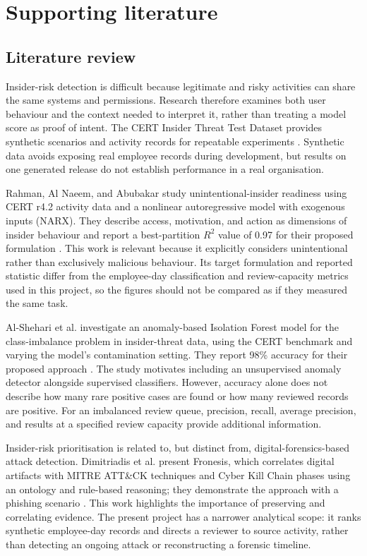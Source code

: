 \documentclass[12pt,a4paper,oneside]{report}
\begin{document}
\chapter{Supporting literature}
\label{chap:literature}

\section{Literature review}
Insider-risk detection is difficult because legitimate and risky
activities can share the same systems and permissions. Research
therefore examines both user behaviour and the context needed to
interpret it, rather than treating a model score as proof of intent.
The CERT Insider Threat Test Dataset provides synthetic scenarios and
activity records for repeatable experiments \cite{cert}. Synthetic
data avoids exposing real employee records during development, but
results on one generated release do not establish performance in a
real organisation.

Rahman, Al Naeem, and Abubakar study unintentional-insider readiness
using CERT r4.2 activity data and a nonlinear autoregressive model with
exogenous inputs (NARX). They describe access, motivation, and action
as dimensions of insider behaviour and report a best-partition
\(R^2\) value of 0.97 for their proposed formulation
\cite{rahman2022unintentional}. This work is relevant because it
explicitly considers unintentional rather than exclusively malicious
behaviour. Its target formulation and reported statistic differ from
the employee-day classification and review-capacity metrics used in
this project, so the figures should not be compared as if they measured
the same task.

Al-Shehari et al. investigate an anomaly-based Isolation Forest model
for the class-imbalance problem in insider-threat data, using the CERT
benchmark and varying the model's contamination setting. They report
98\% accuracy for their proposed approach
\cite{alshehari2023isolation}. The study motivates including an
unsupervised anomaly detector alongside supervised classifiers.
However, accuracy alone does not describe how many rare positive cases
are found or how many reviewed records are positive. For an imbalanced
review queue, precision, recall, average precision, and results at a
specified review capacity provide additional information.

Insider-risk prioritisation is related to, but distinct from,
digital-forensics-based attack detection. Dimitriadis et al. present
Fronesis, which correlates digital artifacts with MITRE ATT\&CK
techniques and Cyber Kill Chain phases using an ontology and
rule-based reasoning; they demonstrate the approach with a phishing
scenario \cite{dimitriadis2023fronesis}. This work highlights the
importance of preserving and correlating evidence. The present project
has a narrower analytical scope: it ranks synthetic employee-day
records and directs a reviewer to source activity, rather than
detecting an ongoing attack or reconstructing a forensic timeline.
\end{document}
